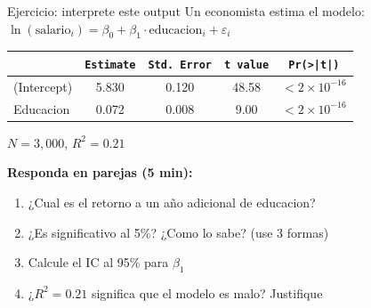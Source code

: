 \documentclass[aspectratio=169, 11pt]{beamer}
\begin{document}

\begin{frame}{Ejercicio: interprete este output}
\small
Un economista estima el modelo: $\ln(\text{salario}_i) = \beta_0 + \beta_1 \cdot \text{educacion}_i + \varepsilon_i$

\vspace{0.2cm}
\begin{center}
\begin{tabular}{lcccc}
\toprule
& \texttt{Estimate} & \texttt{Std. Error} & \texttt{t value} & \texttt{Pr(>|t|)} \\
\midrule
(Intercept) & 5.830 & 0.120 & 48.58 & $< 2 \times 10^{-16}$ \\
Educacion & 0.072 & 0.008 & 9.00 & $< 2 \times 10^{-16}$ \\
\bottomrule
\end{tabular}
\end{center}

$N = 3{,}000$, \quad $R^2 = 0.21$

\vspace{0.3cm}
\textbf{Responda en parejas (5 min):}
\begin{enumerate}\setlength{\itemsep}{2pt}
  \item ¿Cual es el retorno a un a\~no adicional de educacion?
  \item ¿Es significativo al 5\%? ¿Como lo sabe? (use 3 formas)
  \item Calcule el IC al 95\% para $\beta_1$
  \item ¿$R^2 = 0.21$ significa que el modelo es malo? Justifique
\end{enumerate}
\end{frame}
\end{document}
